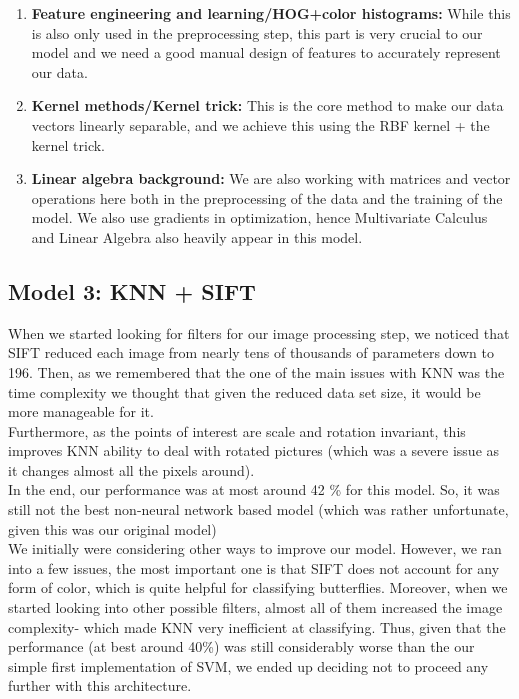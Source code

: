 \documentclass[10pt]{article} %
\begin{document}
\begin{enumerate}
\begin{enumerate}
        \item \textbf{Feature engineering and learning/HOG+color histograms:} While this is also only used in the preprocessing step, this part is very crucial to our model and we need a good manual design of features to accurately represent our data.
        \item \textbf{Kernel methods/Kernel trick:} This is the core method to make our data vectors linearly separable, and we achieve this using the RBF kernel + the kernel trick.
        \item \textbf{Linear algebra background:} We are also working with matrices and vector operations here both in the preprocessing of the data and the training of the model. We also use gradients in optimization, hence Multivariate Calculus and Linear Algebra also heavily appear in this model.
    \end{enumerate}
\end{enumerate}
\subsection{Model 3: KNN + SIFT}
When we started looking for filters for our image processing step, we noticed that SIFT reduced each image from nearly tens of thousands of parameters down to 196. Then, as we remembered that the one of the main issues with KNN was the time complexity we thought that given the reduced data set size, it would be more manageable for it.\\
Furthermore, as the points of interest are scale and rotation invariant, this improves KNN ability to deal with rotated pictures (which was a severe issue as it changes almost all the pixels around).\\
In the end, our performance was at most around 42 \% for this model. So, it was still not the best non-neural network based model (which was rather unfortunate, given this was our original model)\\
We initially were considering other ways to improve our model. However, we ran into a few issues, the most important one is that SIFT does not account for any form of color, which is quite helpful for classifying butterflies. Moreover, when we started looking into other possible filters, almost all of them increased the image complexity- which made KNN very inefficient at classifying.
Thus, given that the performance (at best around 40\%) was still considerably worse than the our simple first implementation of SVM, we ended up deciding not to proceed any further with this architecture.
\end{document}
